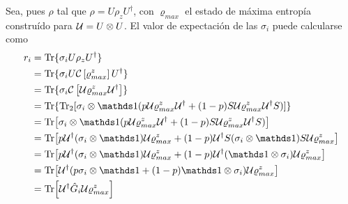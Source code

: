 Sea, pues $\rho$ tal que $\rho=U\rho_{z}U^{\dag}$, con $\varrho_{max}$ el estado de máxima entropía construído para  $\mathcal{U}=U\otimes U$. El valor de expectación de las $\sigma_{i}$ puede calcularse como
\begin{align*}
r_{i}&=\Tr\{\sigma_{i}U\rho_{z}U^{\dag}\}\\
&=\Tr\{\sigma_{i}U\CG{\varrho_{max}^{z}}U^{\dag}\}\\
&=\Tr\{\sigma_{i}\CG{\mcU\varrho_{max}^{z}\mcU^{\dag}}\}\\
&=\Tr\{\Tr_{2}[\sigma_{i}\otimes\Id(p\mcU\varrho_{max}^{z}\mcU^{\dag}+(1-p)S\mcU\varrho_{max}^{z}\mcU^{\dag}S)]\}\\
&=\Tr[\sigma_{i}\otimes\Id(p\mcU\varrho_{max}^{z}\mcU^{\dag}+(1-p)S\mcU\varrho_{max}^{z}\mcU^{\dag}S)]\\
&=\Tr[p\mcU^{\dag}(\sigma_{i}\otimes\Id)\mcU\varrho_{max}^{z}+(1-p)\mcU^{\dag}S(\sigma_{i}\otimes\Id) S\mcU\varrho_{max}^{z}]\\
&=\Tr[p\mcU^{\dag}(\sigma_{i}\otimes\Id)\mcU\varrho_{max}^{z}+(1-p)\mcU^{\dag}(\Id\otimes\sigma_{i})\mcU\varrho_{max}^{z}]\\
&=\Tr[\mcU^{\dag}(p\sigma_{i}\otimes\Id+(1-p)\Id\otimes\sigma_{i})\mcU\varrho_{max}^{z}]\\
&=\Tr[\mcU^{\dag}\hat{G}_{i}\mcU\varrho_{max}^{z}]\\
\end{align*}

